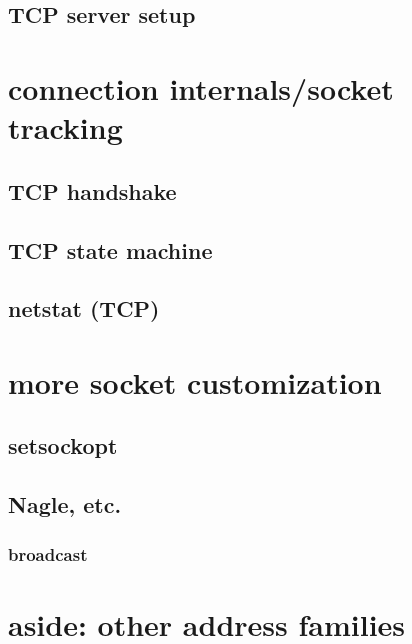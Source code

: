\subsection{TCP server setup}


\section{connection internals/socket tracking}
\subsection{TCP handshake}


\subsection{TCP state machine}


\subsection{netstat (TCP)}


\section{more socket customization}
\subsection{setsockopt}


\subsection{Nagle, etc.}


\subsubsection{broadcast}


\section{aside: other address families}

